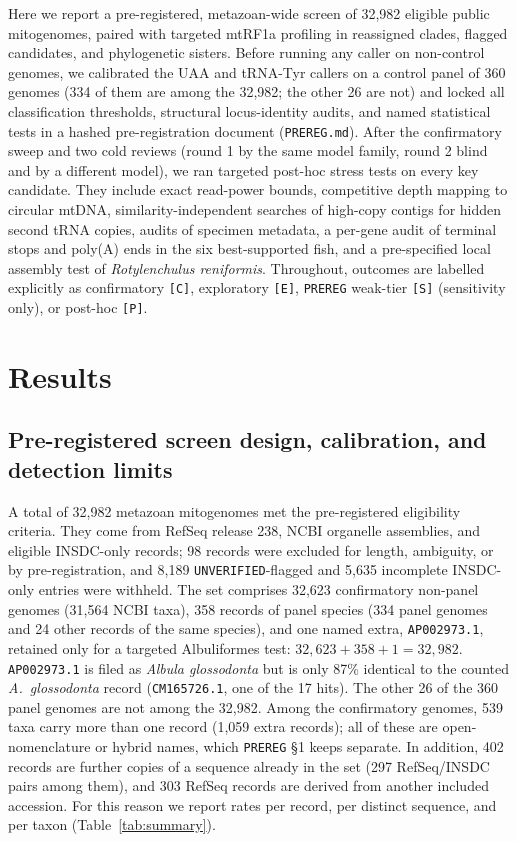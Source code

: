 \documentclass[11pt, a4paper]{article}
\begin{document}
Here we report a pre-registered, metazoan-wide screen of 32,982 eligible public mitogenomes, paired with targeted mtRF1a profiling in reassigned clades, flagged candidates, and phylogenetic sisters. Before running any caller on non-control genomes, we calibrated the UAA and tRNA-Tyr callers on a control panel of 360 genomes (334 of them are among the 32,982; the other 26 are not) and locked all classification thresholds, structural locus-identity audits, and named statistical tests in a hashed pre-registration document (\texttt{PREREG.md}). After the confirmatory sweep and two cold reviews (round 1 by the same model family, round 2 blind and by a different model), we ran targeted post-hoc stress tests on every key candidate. They include exact read-power bounds, competitive depth mapping to circular mtDNA, similarity-independent searches of high-copy contigs for hidden second tRNA copies, audits of specimen metadata, a per-gene audit of terminal stops and poly(A) ends in the six best-supported fish, and a pre-specified local assembly test of \textit{Rotylenchulus reniformis}. Throughout, outcomes are labelled explicitly as confirmatory \texttt{[C]}, exploratory \texttt{[E]}, \texttt{PREREG} weak-tier \texttt{[S]} (sensitivity only), or post-hoc \texttt{[P]}.

\section{Results}

\subsection{Pre-registered screen design, calibration, and detection limits}
A total of 32,982 metazoan mitogenomes met the pre-registered eligibility criteria. They come from RefSeq release 238, NCBI organelle assemblies, and eligible INSDC-only records; 98 records were excluded for length, ambiguity, or by pre-registration, and 8,189 \texttt{UNVERIFIED}-flagged and 5,635 incomplete INSDC-only entries were withheld. The set comprises 32,623 confirmatory non-panel genomes (31,564 NCBI taxa), 358 records of panel species (334 panel genomes and 24 other records of the same species), and one named extra, \texttt{AP002973.1}, retained only for a targeted Albuliformes test: $32{,}623 + 358 + 1 = 32{,}982$. \texttt{AP002973.1} is filed as \textit{Albula glossodonta} but is only 87\% identical to the counted \textit{A.\ glossodonta} record (\texttt{CM165726.1}, one of the 17 hits). The other 26 of the 360 panel genomes are not among the 32,982. Among the confirmatory genomes, 539 taxa carry more than one record (1,059 extra records); all of these are open-nomenclature or hybrid names, which \texttt{PREREG} \S 1 keeps separate. In addition, 402 records are further copies of a sequence already in the set (297 RefSeq/INSDC pairs among them), and 303 RefSeq records are derived from another included accession. For this reason we report rates per record, per distinct sequence, and per taxon (Table~\ref{tab:summary}).
\end{document}
